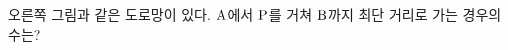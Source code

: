 \noindent\begin{minipage}[t]{0.58\linewidth}\vspace{0pt}\raggedright 오른쪽 그림과 같은 도로망이 있다. $\mathrm{A}$에서 $\mathrm{P}$를 거쳐 $\mathrm{B}$까지 최단 거리로 가는 경우의 수는?\end{minipage}\hfill\begin{minipage}[t]{0.4\linewidth}\vspace{0pt}\centering \resizebox{\ifdim\width>\linewidth\linewidth\else\width\fi}{!}{}\end{minipage}\par
{}
